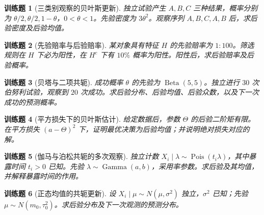 \documentclass[UTF8,12pt,a4paper,fontset=fandol]{ctexbook}
\newtheorem{exercise}{训练题}[section]
\begin{document}
\begin{exercise}[三类别观察的贝叶斯更新]\label{q:M-E2-II2}
独立试验产生 $A,B,C$ 三种结果，概率分别为 $\theta/2,\theta/2,1-\theta$，$0<\theta<1$。先验密度为 $3\theta^2$。观察序列 $A,B,C,A,B$ 后，求后验密度及后验均值。\par{}\end{exercise}

\begin{exercise}[先验赔率与后验赔率]\label{q:M-E2-II3}
某对象具有特征 $H$ 的先验赔率为 $1:100$。筛选规则在 $H$ 下必为阳性，在 $H^c$ 下有 $10\%$ 概率为阳性。阳性后，求后验赔率及后验概率。\par{}\end{exercise}

\begin{exercise}[贝塔与二项共轭]\label{q:M-F-C14}
成功概率 $\theta$ 的先验为 $\operatorname{Beta}(5,5)$。独立进行 $30$ 次伯努利试验，观察到 $20$ 次成功。求后验分布、后验均值、后验众数，以及下一次成功的预测概率。\par{}\end{exercise}

\begin{exercise}[平方损失下的贝叶斯估计]\label{q:B12.1}
给定数据后，参数 $\Theta$ 的后验二阶矩有限。在平方损失 $(a-\Theta)^2$ 下，证明最优决策为后验均值；并说明绝对损失对应的解。\par{}\end{exercise}

\begin{exercise}[伽马与泊松共轭的多次观察]\label{q:B12.2}
独立计数 $X_i\mid\lambda\sim\operatorname{Pois}(t_i\lambda)$，其中暴露时间 $t_i>0$ 已知。先验 $\lambda\sim\operatorname{Gamma}(a,b)$，采用率参数。求后验及其均值，并解释暴露时间的作用。\par{}\end{exercise}

\begin{exercise}[正态均值的共轭更新]\label{q:B12.3}
设 $X_i\mid\mu\sim N(\mu,\sigma^2)$ 独立，$\sigma^2$ 已知；先验 $\mu\sim N(m_0,\tau_0^2)$。求后验分布及下一次观测的预测分布。\par{}\end{exercise}
\end{document}
